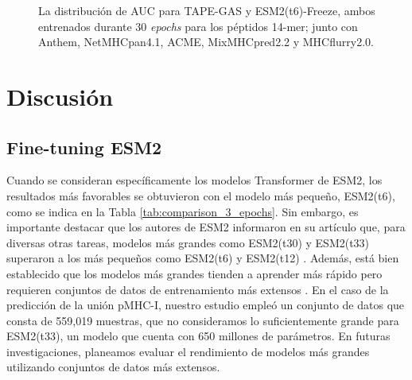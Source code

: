 \begin{figure}[H]
	\centering	
	
	\caption{
		La distribución de AUC para TAPE-GAS y ESM2(t6)-Freeze, ambos entrenados durante 30 \textit{epochs} para los péptidos 14-mer; junto con Anthem, NetMHCpan4.1, ACME, MixMHCpred2.2 y MHCflurry2.0.}
	\label{fig:auc_distribution14}
\end{figure}

\clearpage

\section{Discusión}

\subsection{Fine-tuning ESM2}

Cuando se consideran específicamente los modelos Transformer de ESM2, los resultados más favorables se obtuvieron con el modelo más pequeño, ESM2(t6), como se indica en la Tabla \ref{tab:comparison_3_epochs}. Sin embargo, es importante destacar que los autores de ESM2 informaron en su artículo que, para diversas otras tareas, modelos más grandes como ESM2(t30) y ESM2(t33) superaron a los más pequeños como ESM2(t6) y ESM2(t12) \citep{lin2023evolutionary}. Además, está bien establecido que los modelos más grandes tienden a aprender más rápido pero requieren conjuntos de datos de entrenamiento más extensos \citep{elnaggar2021prottrans}. En el caso de la predicción de la unión pMHC-I, nuestro estudio empleó un conjunto de datos que consta de 559,019 muestras, que no consideramos lo suficientemente grande para ESM2(t33), un modelo que cuenta con 650 millones de parámetros. En futuras investigaciones, planeamos evaluar el rendimiento de modelos más grandes utilizando conjuntos de datos más extensos.

